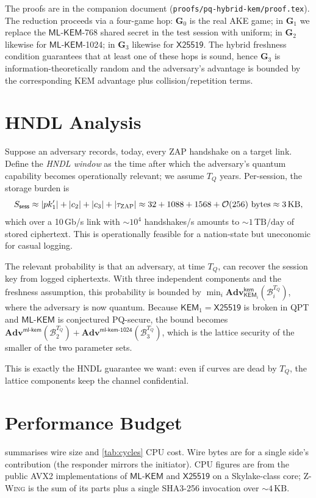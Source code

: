 \documentclass[11pt,a4paper]{article}
\theoremstyle{definition}
\theoremstyle{remark}
\newcommand{\KEM}{\ensuremath{\mathsf{KEM}}}
\newcommand{\Adv}{\ensuremath{\mathbf{Adv}}}
\providecommand{\Game}{}\renewcommand{\Game}{\ensuremath{\mathbf{G}}}
\newcommand{\zwing}{\textsc{Z-Wing}}
\newcommand{\zap}{\textsc{ZAP}}
\newcommand{\mlkem}{\ensuremath{\mathsf{ML\text{-}KEM}}}
\newcommand{\xtf}{\ensuremath{\mathsf{X25519}}}
\newcommand{\transcript}{\ensuremath{\tau}}
\begin{document}
The proofs are in the companion document (\texttt{proofs/pq-hybrid-kem/proof.tex}).
The reduction proceeds via a four-game hop:
$\Game_0$ is the real AKE game; in $\Game_1$ we replace the $\mlkem$-768
shared secret in the test session with uniform; in $\Game_2$ likewise for
$\mlkem$-1024; in $\Game_3$ likewise for \xtf{}. The hybrid freshness
condition guarantees that at least one of these hops is sound, hence
$\Game_3$ is information-theoretically random and the adversary's advantage
is bounded by the corresponding KEM advantage plus collision/repetition
terms.

\section{HNDL Analysis}\label{sec:hndl}

Suppose an adversary records, today, every \zap{} handshake on a target
link. Define the \emph{HNDL window} as the time after which the adversary's
quantum capability becomes operationally relevant; we assume $T_Q$ years.
Per-session, the storage burden is
\[
S_{\mathsf{sess}} \approx |pk_1'| + |c_2| + |c_3| + |\transcript_{\zap}|
\approx 32 + 1088 + 1568 + \mathcal{O}(256) \text{ bytes} \approx 3\,\text{KB},
\]
which over a 10\,Gb/s link with $\sim 10^4$ handshakes/s amounts to
$\sim 1\,\text{TB/day}$ of stored ciphertext. This is operationally
feasible for a nation-state but uneconomic for casual logging.

The relevant probability is that an adversary, at time $T_Q$, can recover the
session key from logged ciphertexts. With three independent components
and the freshness assumption, this probability is bounded by
$\min_i \Adv^{\mathsf{kem}}_{\KEM_i}(\mathcal{B}_i^{T_Q})$, where the
adversary is now quantum. Because $\KEM_1 = \xtf{}$ is broken in QPT and
\mlkem{} is conjectured PQ-secure, the bound becomes
$\Adv^{\mathsf{ml\text{-}kem}}(\mathcal{B}_2^{T_Q}) +
 \Adv^{\mathsf{ml\text{-}kem\text{-}1024}}(\mathcal{B}_3^{T_Q})$,
which is the lattice security of the smaller of the two parameter sets.

This is exactly the HNDL guarantee we want: even if curves are dead by
$T_Q$, the lattice components keep the channel confidential.

\section{Performance Budget}\label{sec:perf}

 summarises wire size and \cref{tab:cycles} CPU cost.
Wire bytes are for a single side's contribution (the responder mirrors the
initiator). CPU figures are from the public AVX2 implementations of
\mlkem{} and \xtf{} on a Skylake-class core; \zwing{} is the sum of its
parts plus a single SHA3-256 invocation over $\sim 4\,\text{KB}$.
\end{document}
